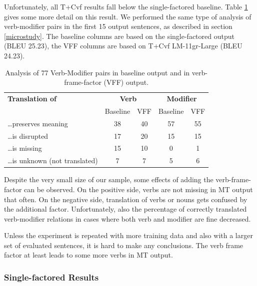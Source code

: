 \documentclass[11pt]{report}
\theoremstyle{plain}
\begin{document}
{{Unfortunately, all T+Cvf results fall below the single-factored baseline.
Table \ref{vffanalysis} gives some more detail on this result. We performed the
same type of analysis of verb-modifier pairs in the first 15 output sentences,
as described in section \ref{microstudy}. The baseline columns are based on the
single-factored output (BLEU 25.23), the VFF columns are based on T+Cvf
LM-11gr-Large (BLEU 24.23).


\begin{table}[ht]
\begin{center}
\begin{tabular}{lcc|cc}
\bf Translation of  &  \multicolumn{2}{c}{\bf Verb}  &  \multicolumn{2}{c}{\bf Modifier}\\
      &  Baseline  &  VFF  &  Baseline  &  VFF\\
\hline
\dots{}preserves meaning    &     38  &    40  &     57  &    55\\
\dots{}is disrupted   &     17  &    20  &     15  &    15\\
\dots{}is missing  &     15  &    10  &      0  &     1\\
\dots{}is unknown (not translated)   &      7  &     7  &      5  &     6\\
\end{tabular}
\end{center}
\caption{Analysis of 77 Verb-Modifier pairs in baseline output and in
verb-frame-factor (VFF) output.}
\label{vffanalysis}
\end{table}

Despite the very small size of our sample, some effects
of adding the verb-frame-factor can be observed. On the positive side, verbs are
not missing in MT output that often. On the negative side, translation of verbs
or nouns gets confused by the additional factor. Unfortunately, also the
percentage of correctly translated verb-modifier relations in cases where both
verb and modifier are fine decreased.

Unless the experiment is repeated with more training data and also with a larger
set of evaluated sentences, it is hard to make any conclusions. The
verb frame factor at least leads to some more verbs in MT output.








\subsubsection{Single-factored Results \toen{}}

}}
\end{document}
